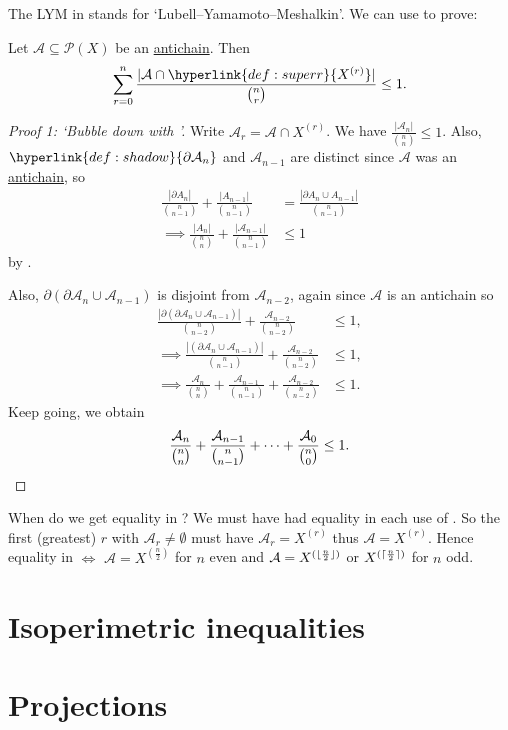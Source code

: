\documentclass{article}
\DeclarePairedDelimiter\ceil{\lceil}{\rceil}
\DeclarePairedDelimiter\floor{\lfloor}{\rfloor}
\newcommand{\ihalf}[1]{\floor{\frac{#1}{2}}}
\newcommand{\ihalfc}[1]{\ceil{\frac{#1}{2}}}
\let\subset\subseteq
\begin{document}
The LYM in  stands for `Lubell–Yamamoto–Meshalkin'.
We can use  to prove:
\begin{nthm}[LYM]\label{thm:lym}
  Let $\mathcal{A} \subset \mathcal{P}(X)$ be an \hyperlink{def:antichain}{antichain}.
  Then
  \begin{equation*}
    \sum_{r=0}^n \frac{|\mathcal{A} \cap \hyperlink{def:superr}{X^{(r)}}|}{\binom{n}{r}} \leq 1.
  \end{equation*}
\end{nthm}
\begin{proof}[Proof 1: `Bubble down with ']
  Write $\mathcal{A}_r = \mathcal{A} \cap X^{(r)}$.
  We have $\frac{|\mathcal{A}_n|}{\binom{n}{n}} \leq 1$.
  Also, $\hyperlink{def:shadow}{\partial \mathcal{A}_n}$ and $\mathcal{A}_{n-1}$ are distinct since $\mathcal{A}$ was an \hyperlink{def:antichain}{antichain}, so
  \begin{align*}
    \frac{|\partial A_n|}{\binom{n}{n-1}} + \frac{|A_{n-1}|}{\binom{n}{n-1}} &= \frac{|\partial A_n \cup A_{n-1}|}{\binom{n}{n-1}} \\
    \implies \frac{|A_n|}{\binom{n}{n}} + \frac{|\mathcal{A}_{n-1}|}{\binom{n}{n-1}} &\leq 1
  \end{align*}
  by .

  Also, $\partial(\partial \mathcal{A}_n \cup \mathcal{A}_{n-1})$ is disjoint from $\mathcal{A}_{n-2}$, again since $\mathcal{A}$ is an antichain so
  \begin{align*}
    \frac{|\partial(\partial \mathcal{A}_n \cup \mathcal{A}_{n-1})|}{\binom{n}{n-2}} + \frac{\mathcal{A}_{n-2}}{{n \choose n-2}} &\leq 1, \\
    \implies \frac{|(\partial \mathcal{A}_n \cup \mathcal{A}_{n-1})|}{\binom{n}{n-1}} + \frac{\mathcal{A}_{n-2}}{{n \choose n-2}} &\leq 1, \\
    \implies \frac{\mathcal{A}_n}{\binom{n}{n}} + \frac{\mathcal{A}_{n-1}}{\binom{n}{n-1}} + \frac{\mathcal{A}_{n-2}}{\binom{n}{n-2}} &\leq 1.
  \end{align*}
  Keep going, we obtain
  \begin{equation*}
    \frac{\mathcal{A}_n}{\binom{n}{n}} + \frac{\mathcal{A}_{n-1}}{\binom{n}{n-1}} + \dotsm + \frac{\mathcal{A}_0}{\binom{n}{0}} \leq 1. \qedhere
  \end{equation*}
\end{proof}

When do we get equality in ?
We must have had equality in each use of .
So the first (greatest) $r$ with $\mathcal{A}_r \neq \emptyset$ must have $\mathcal{A}_r = X^{(r)}$ thus $\mathcal{\mathcal{A}} = X^{(r)}$.
Hence equality in  $\iff$ $\mathcal{A} = X^{(\frac{n}{2})}$ for $n$ even and $\mathcal{A} = X^{(\ihalf{n})}$ or $X^{(\ihalfc{n})}$ for $n$ odd.
\section{Isoperimetric inequalities}
\section{Projections}
\printindex
\end{document}
